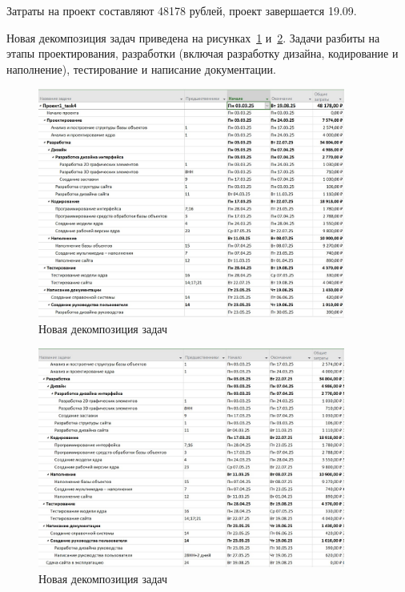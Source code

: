 Затраты на проект составляют 48178 рублей, проект завершается 19.09.

Новая декомпозиция задач приведена на рисунках~\ref{fig:screen10} и~\ref{fig:screen11}.
Задачи разбиты на этапы проектирования, разработки (включая разработку дизайна, кодирование и наполнение), тестирование и написание документации.

\begin{figure}[H]
	\centering
	\includegraphics[width=0.9\textwidth]{img/screen5_2.jpg}
	\caption{Новая декомпозиция задач}
	\label{fig:screen10}
\end{figure}

\begin{figure}[H]
	\centering
	\includegraphics[width=0.9\textwidth]{img/screen5_3.jpg}
	\caption{Новая декомпозиция задач}
	\label{fig:screen11}
\end{figure}

